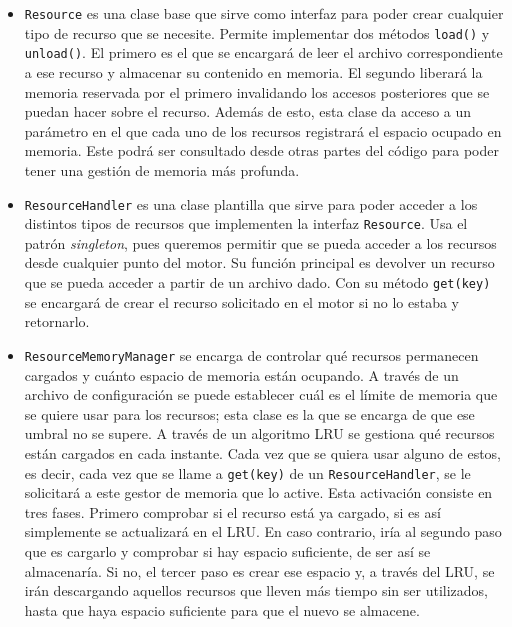 \begin{itemize}
	\item \texttt{Resource} es una clase base que sirve como interfaz para poder crear cualquier tipo de recurso que se necesite. Permite implementar dos métodos \texttt{load()} y \texttt{unload()}. El primero es el que se encargará de leer el archivo correspondiente a ese recurso y almacenar su contenido en memoria. El segundo liberará la memoria reservada por el primero invalidando los accesos posteriores que se puedan hacer sobre el recurso. Además de esto, esta clase da acceso a un parámetro en el que cada uno de los recursos registrará el espacio ocupado en memoria. Este podrá ser consultado desde otras partes del código para poder tener una gestión de memoria más profunda.
	\item \texttt{ResourceHandler} es una clase plantilla que sirve para poder acceder a los distintos tipos de recursos que implementen la interfaz \texttt{Resource}. Usa el patrón \textit{singleton}, pues queremos permitir que se pueda acceder a los recursos desde cualquier punto del motor. Su función principal es devolver un recurso que se pueda acceder a partir de un archivo dado. Con su método \texttt{get(key)} se encargará de crear el recurso solicitado en el motor si no lo estaba y retornarlo. 
	\item \texttt{ResourceMemoryManager} se encarga de controlar qué recursos permanecen cargados y cuánto espacio de memoria están ocupando. A través de un archivo de configuración se puede establecer cuál es el límite de memoria que se quiere usar para los recursos; esta clase es la que se encarga de que ese umbral no se supere. A través de un algoritmo LRU se gestiona qué recursos están cargados en cada instante. Cada vez que se quiera usar alguno de estos, es decir, cada vez que se llame a \texttt{get(key)} de un \texttt{ResourceHandler}, se le solicitará a este gestor de memoria que lo active. Esta activación consiste en tres fases. Primero comprobar si el recurso está ya cargado, si es así simplemente se actualizará en el LRU. En caso contrario, iría al segundo paso que es cargarlo y comprobar si hay espacio suficiente, de ser así se almacenaría. Si no, el tercer paso es crear ese espacio y, a través del LRU, se irán descargando aquellos recursos que lleven más tiempo sin ser utilizados, hasta que haya espacio suficiente para que el nuevo se almacene.
\end{itemize}


